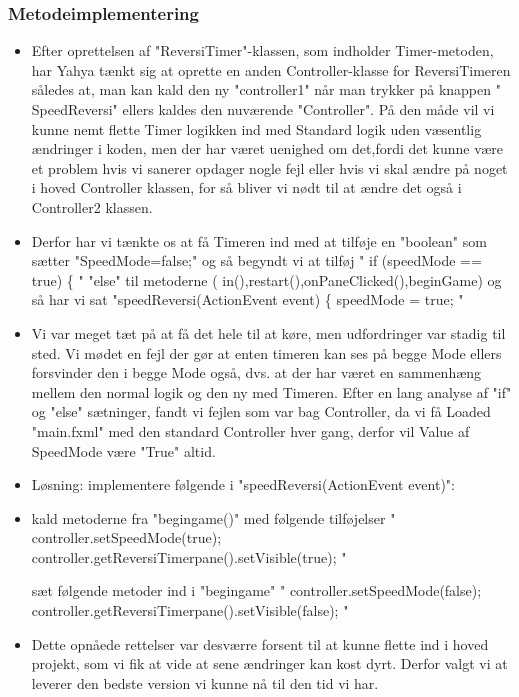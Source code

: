 \subsubsection{Metodeimplementering}\label{MI}
\begin{itemize}
\item Efter oprettelsen af "ReversiTimer"-klassen, som indholder Timer-metoden, har Yahya tænkt sig at oprette en anden Controller-klasse for ReversiTimeren således at, man kan kald den ny "controller1" når man trykker på knappen " SpeedReversi" ellers kaldes den nuværende "Controller".
På den måde vil vi kunne nemt flette Timer logikken ind med Standard logik uden væsentlig ændringer i koden, men der har været uenighed om det,fordi det kunne være et problem hvis vi sanerer opdager nogle fejl eller hvis vi skal ændre på noget i hoved Controller klassen, for så bliver vi nødt til at ændre det også i Controller2 klassen. 
\item Derfor har vi tænkte os at få Timeren ind med at tilføje en "boolean" som sætter "SpeedMode=false;" og så begyndt vi at tilføj 
" if (speedMode == true) \{ " "else" til metoderne ( in(),restart(),onPaneClicked(),beginGame) og så har vi sat 
"speedReversi(ActionEvent event) \{	
		speedMode = true; "
\item Vi var meget tæt på at få det hele til at køre, men udfordringer var stadig til sted. Vi mødet en fejl der gør at enten timeren kan ses på begge Mode ellers forsvinder den i begge Mode også, dvs. at der har været en sammenhæng mellem den normal logik og den ny med Timeren.
Efter en lang analyse af "if" og "else" sætninger, fandt vi fejlen som var bag Controller, da vi få Loaded "main.fxml" med den standard Controller hver gang, derfor vil Value af SpeedMode være "True" altid. 

\item Løsning: 
implementere følgende i "speedReversi(ActionEvent event)":
\item kald metoderne fra "begingame()" med følgende tilføjelser 
" controller.setSpeedMode(true);
            controller.getReversiTimerpane().setVisible(true); " 

   sæt følgende metoder ind i "begingame"
   " controller.setSpeedMode(false);
        controller.getReversiTimerpane().setVisible(false); "

\item Dette opnåede rettelser var desværre forsent til at kunne flette ind i hoved projekt, som vi fik at vide at sene ændringer kan kost dyrt. Derfor valgt vi at leverer den bedste version vi kunne nå til den tid vi har. 
\end{itemize}








